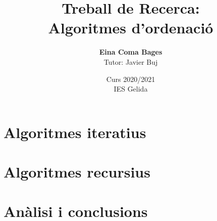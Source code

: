 \documentclass[a4paper,12pt]{report}
\title{Treball de Recerca: \\ \textbf{Algoritmes d'ordenació}}
\author{\textbf{Eina Coma Bages} \\ Tutor: Javier Buj}
\date{Curs 2020/2021 \\ IES Gelida}
\begin{document}
	\maketitle
	\tableofcontents
	
	
	
	
	
	\part{Algoritmes iteratius}
	
	
	
	

	\part{Algoritmes recursius}
	
	
	
	
	\part{Anàlisi i conclusions}
	
	

	

	
	
\end{document}
